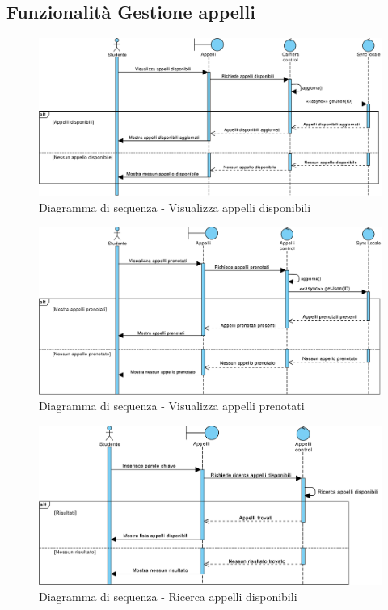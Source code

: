 \subsection{Funzionalità Gestione appelli}

\begin{figure} [h]
	\centering
	\includegraphics[width=6.5in]{imgs/gruppo1/sequence_diagrams/SD6_visualizza_appelli_disponibili.pdf}
	\caption{Diagramma di sequenza - Visualizza appelli disponibili}
	\label{diag:visualizzaAppelliDisponibiliSD}
\end{figure}

\begin{figure}
	\centering
	\includegraphics[width=6.5in]{imgs/gruppo1/sequence_diagrams/SD7_visualizza_appelli_prenotati.pdf}
	\caption{Diagramma di sequenza - Visualizza appelli prenotati}
	\label{diag:visualizzaAppelliPrenotatiSD}
\end{figure}

\begin{figure}
	\centering
	\includegraphics[width=6.5in]{imgs/gruppo1/sequence_diagrams/SD8_ricerca_appelli_disponibili.pdf}
	\caption{Diagramma di sequenza - Ricerca appelli disponibili}
	\label{diag:ricercaAppelliDisponibiliSD}
\end{figure}
\newpage

